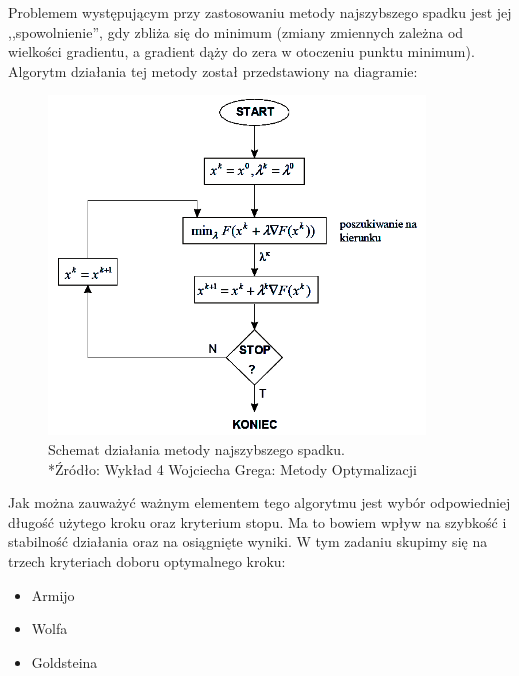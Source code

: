 \documentclass{classrep}
\begin{document}
Problemem występującym przy zastosowaniu metody najszybszego spadku jest jej ,,spowolnienie'', gdy zbliża się do minimum (zmiany zmiennych zależna od wielkości gradientu, a gradient dąży do zera w otoczeniu punktu minimum). Algorytm działania tej metody został przedstawiony na diagramie:
\begin{figure}[h!]
\centering
\includegraphics[width=10cm]{obrazy/metodaNS_algo} 
\caption{Schemat działania metody najszybszego spadku.\\*{\footnotesize Źródło: Wykład 4 Wojciecha Grega: Metody Optymalizacji}}
\label{fig:metodaNS_algo}
\end{figure}

Jak można zauważyć ważnym elementem tego algorytmu jest wybór odpowiedniej długość użytego kroku oraz kryterium stopu. Ma to bowiem wpływ na szybkość i stabilność działania oraz na osiągnięte wyniki. W tym zadaniu skupimy się na trzech kryteriach doboru optymalnego kroku:
\begin{itemize}
\item Armijo
\item Wolfa
\item Goldsteina
\end{itemize}
\end{document}
